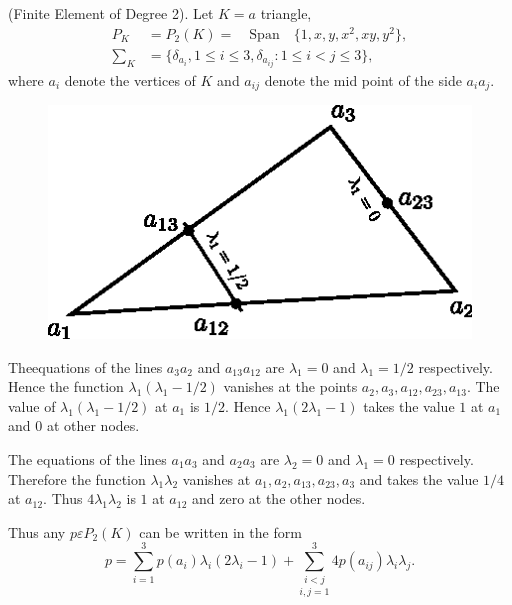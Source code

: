 \begin{exam}\label{chap3:exm2}
(Finite Element of Degree 2). Let $K=a$ triangle, 
\begin{align*}
P_K &= P_2(K)=\quad\text{Span}\quad \{1, x, y, x^2, xy, y^2\},\\
\sum_K &= \{\delta_{a_i}, 1\leq i\leq 3, \delta_{a_{ij}} :1\leq i<j\leq 3\},
\end{align*}
where $a_i$ denote the vertices of $K$ and $a_{ij}$ denote the mid
point of the side $a_ia_j$.
\begin{figure}[H]
\centering
\includegraphics{figure/fig3.4.eps}
\caption{}\label{fig3.4}
\end{figure}


The\pageoriginale equations of the lines $a_3 a_2$ and $a_{13} a_{12}$
are $\lambda_1=0$ and $\lambda_1=1/2$ respectively. Hence the function
$\lambda_1 (\lambda_1-1/2)$ vanishes at the points $a_2, a_3, a_{12},
a_{23}, a_{13}$. The value of $\lambda_1 (\lambda_1-1/2)$ at $a_1$ is
$1/2$. Hence $\lambda_1(2\lambda_1-1)$ takes the value $1$ at $a_1$ and
$0$ at other nodes.

The equations of the lines $a_1 a_3$ and $a_2 a_3$ are $\lambda_2=0$
and $\lambda_1=0$ respectively. Therefore the function
$\lambda_1\lambda_2$ vanishes at $a_1, a_2, a_{13}, a_{23}, a_3$ and
takes the value $1/4$ at $a_{12}$. Thus $4\lambda_1\lambda_2$ is $1$
at $a_{12}$ and zero at the other nodes.

Thus any $p\varepsilon P_2(K)$ can be written in the form 
$$
p=\sum\limits_{i=1}^3p(a_i)\lambda_i(2\lambda_i-1)+\underset{i,
j=1}{\sum\limits_{i<j}^3} 4p(a_{ij})\lambda_i\lambda_j.
$$  
\end{exam}

